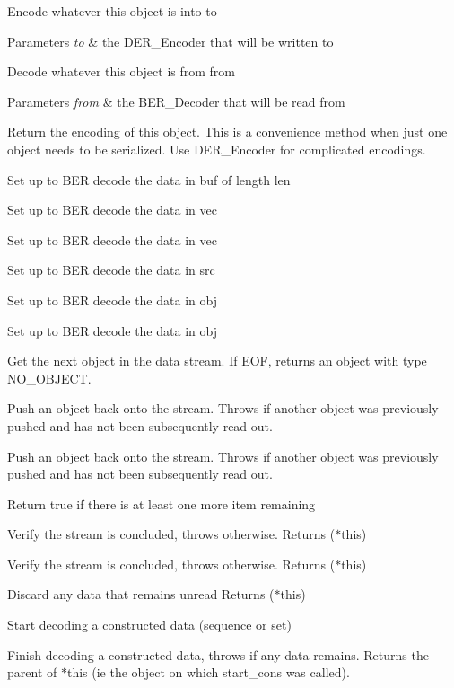 Encode whatever this object is into to 
\begin{DoxyParams}{Parameters}
{\em to} & the D\+E\+R\+\_\+\+Encoder that will be written to\\
\hline
\end{DoxyParams}
Decode whatever this object is from from 
\begin{DoxyParams}{Parameters}
{\em from} & the B\+E\+R\+\_\+\+Decoder that will be read from\\
\hline
\end{DoxyParams}
Return the encoding of this object. This is a convenience method when just one object needs to be serialized. Use D\+E\+R\+\_\+\+Encoder for complicated encodings.

Set up to B\+ER decode the data in buf of length len

Set up to B\+ER decode the data in vec

Set up to B\+ER decode the data in vec

Set up to B\+ER decode the data in src

Set up to B\+ER decode the data in obj

Set up to B\+ER decode the data in obj

Get the next object in the data stream. If E\+OF, returns an object with type N\+O\+\_\+\+O\+B\+J\+E\+CT.

Push an object back onto the stream. Throws if another object was previously pushed and has not been subsequently read out.

Push an object back onto the stream. Throws if another object was previously pushed and has not been subsequently read out.

Return true if there is at least one more item remaining

Verify the stream is concluded, throws otherwise. Returns ($\ast$this)

Verify the stream is concluded, throws otherwise. Returns ($\ast$this)

Discard any data that remains unread Returns ($\ast$this)

Start decoding a constructed data (sequence or set)

Finish decoding a constructed data, throws if any data remains. Returns the parent of $\ast$this (ie the object on which start\+\_\+cons was called).


